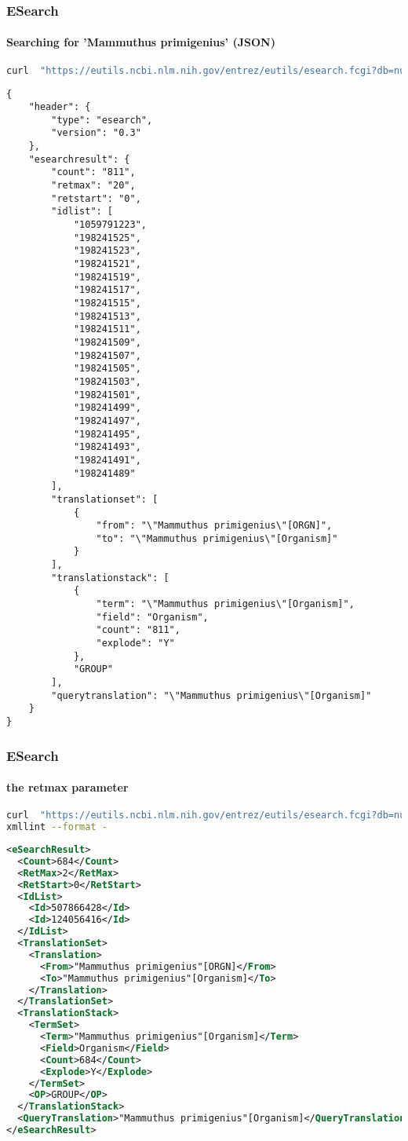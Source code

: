 \documentclass{beamer}
\begin{document}
\begin{frame}[fragile]
\frametitle{ESearch}
\framesubtitle{Searching for 'Mammuthus primigenius' (JSON) }
\begin{lstlisting}[language=bash,basicstyle=\tiny,breaklines=true]
 curl  "https://eutils.ncbi.nlm.nih.gov/entrez/eutils/esearch.fcgi?db=nucleotide&term=%22Mammuthus%20primigenius%22%5BORGN%5D&retmode=json"
\end{lstlisting}

\begin{lstlisting}[basicstyle=\tiny,breaklines=false]
{
    "header": {
        "type": "esearch",
        "version": "0.3"
    },
    "esearchresult": {
        "count": "811",
        "retmax": "20",
        "retstart": "0",
        "idlist": [
            "1059791223",
            "198241525",
            "198241523",
            "198241521",
            "198241519",
            "198241517",
            "198241515",
            "198241513",
            "198241511",
            "198241509",
            "198241507",
            "198241505",
            "198241503",
            "198241501",
            "198241499",
            "198241497",
            "198241495",
            "198241493",
            "198241491",
            "198241489"
        ],
        "translationset": [
            {
                "from": "\"Mammuthus primigenius\"[ORGN]",
                "to": "\"Mammuthus primigenius\"[Organism]"
            }
        ],
        "translationstack": [
            {
                "term": "\"Mammuthus primigenius\"[Organism]",
                "field": "Organism",
                "count": "811",
                "explode": "Y"
            },
            "GROUP"
        ],
        "querytranslation": "\"Mammuthus primigenius\"[Organism]"
    }
}

\end{lstlisting}
\end{frame}


\begin{frame}[fragile]
\frametitle{ESearch}
\framesubtitle{the retmax parameter }
\begin{lstlisting}[language=bash,basicstyle=\tiny,breaklines=true]
curl  "https://eutils.ncbi.nlm.nih.gov/entrez/eutils/esearch.fcgi?db=nucleotide&term=%22Mammuthus%20primigenius%22%5BORGN%5D&retmax=2" |\
xmllint --format -
\end{lstlisting}

\begin{lstlisting}[language=xml,basicstyle=\tiny,breaklines=false]
<eSearchResult>
  <Count>684</Count>
  <RetMax>2</RetMax>
  <RetStart>0</RetStart>
  <IdList>
    <Id>507866428</Id>
    <Id>124056416</Id>
  </IdList>
  <TranslationSet>
    <Translation>
      <From>"Mammuthus primigenius"[ORGN]</From>
      <To>"Mammuthus primigenius"[Organism]</To>
    </Translation>
  </TranslationSet>
  <TranslationStack>
    <TermSet>
      <Term>"Mammuthus primigenius"[Organism]</Term>
      <Field>Organism</Field>
      <Count>684</Count>
      <Explode>Y</Explode>
    </TermSet>
    <OP>GROUP</OP>
  </TranslationStack>
  <QueryTranslation>"Mammuthus primigenius"[Organism]</QueryTranslation>
</eSearchResult>
\end{lstlisting}
\end{frame}
\end{document}
